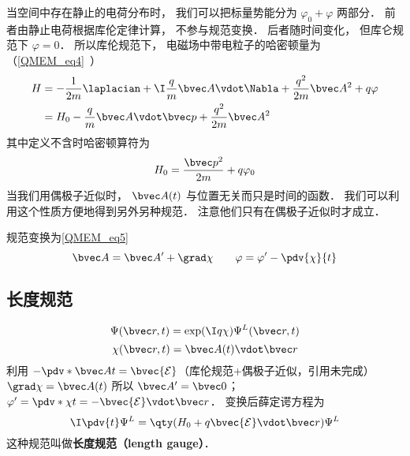 
\begin{issues}
\issueDraft
\end{issues}


当空间中存在静止的电荷分布时， 我们可以把标量势能分为 $\varphi_0 + \varphi$ 两部分． 前者由静止电荷根据库伦定律计算， 不参与规范变换． 后者随时间变化， 但库仑规范下 $\varphi = 0$． 所以库伦规范下， 电磁场中带电粒子的哈密顿量为（\autoref{QMEM_eq4}~）
\begin{equation}
\begin{aligned}
H &= -\frac{1}{2m} \laplacian + \I \frac{q}{m} \bvec A \vdot \Nabla + \frac{q^2}{2m} \bvec A^2 + q\varphi\\
&= H_0 - \frac{q}{m} \bvec A \vdot \bvec p + \frac{q^2}{2m} \bvec A^2
\end{aligned}
\end{equation}
其中定义不含时哈密顿算符为
\begin{equation}
H_0 = \frac{\bvec p^2}{2m} + q\varphi_0
\end{equation}
当我们用偶极子近似时， $\bvec A(t)$ 与位置无关而只是时间的函数． 我们可以利用这个性质方便地得到另外另种规范． 注意他们只有在偶极子近似时才成立．

规范变换为\autoref{QMEM_eq5}~
\begin{equation}\label{LVgaug_eq1}
\bvec A = \bvec A' + \grad \chi
\qquad
\varphi = \varphi' - \pdv{\chi}{t}
\end{equation}

\subsection{长度规范}

\begin{equation}
\Psi(\bvec r, t) = \exp(\I q\chi)\Psi^L(\bvec r, t)
\end{equation}
\begin{equation}
\chi(\bvec r, t) = \bvec A(t) \vdot \bvec r
\end{equation}
利用 $-\pdv*{\bvec A}{t} = \bvec {\mathcal E}$（库伦规范+偶极子近似，引用未完成） $\grad \chi = \bvec A(t)$ 所以 $\bvec A' = \bvec 0$； $\varphi' = \pdv*{\chi}{t} = -\bvec {\mathcal E} \vdot \bvec r$． 变换后薛定谔方程为
\begin{equation}
\I \pdv{t} \Psi^L = \qty(H_0 + q\bvec{\mathcal{E}} \vdot \bvec r) \Psi^L
\end{equation}
这种规范叫做\textbf{长度规范（length gauge）}．

